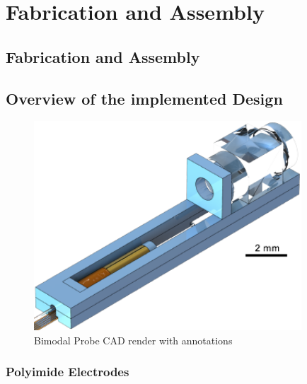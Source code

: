 %

\chapter{Fabrication and Assembly}
\label{Ch:Fab}	

\section{Fabrication and Assembly}
\clearpage
\section{Overview of the implemented Design}
\begin{figure}[h!]\centering 
\includegraphics[width=10cm]{figures/30_DesignSimulation/Overview/BimodalBenchDoubleLens.pdf}
      \caption{Bimodal Probe CAD render with annotations}
\end{figure}

\subsection{Polyimide Electrodes}

